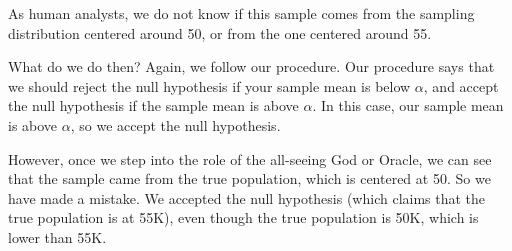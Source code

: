 \documentclass[../../../main.tex]{subfiles}
\begin{document}
\begin{center}
\end{center}

\noindent
As human analysts, we do not know if this sample comes from the sampling distribution centered around 50, or from the one centered around 55. 

What do we do then? Again, we follow our procedure. Our procedure says that we should reject the null hypothesis if your sample mean is below $\alpha$, and accept the null hypothesis if the sample mean is above $\alpha$. In this case, our sample mean is above $\alpha$, so we accept the null hypothesis.

However, once we step into the role of the all-seeing God or Oracle, we can see that the sample came from the true population, which is centered at 50. So we have made a mistake. We accepted the null hypothesis (which claims that the true population is at 55K), even though the true population is 50K, which is lower than 55K. 
\end{document}
